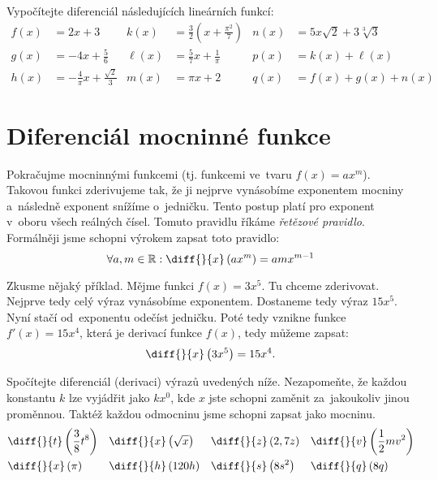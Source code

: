 \begin{exercise}
    Vypočítejte diferenciál následujících lineárních funkcí:
    \begin{align*}
        f(x) &= 2x + 3
        & k(x) &= \frac{3}{2} \left( x + \frac{\pi^2}{7} \right) 
        & n(x) &= 5x \sqrt{2} + 3 \sqrt[3]{3} \\
        g(x) &= -4x + \frac{5}{6}
        & \ell(x) &= \frac{5}{7}x + \frac{1}{\pi}
        & p(x) &= k(x) + \ell(x) \\
        h(x) &= -\frac{4}{\pi}x + \frac{\sqrt{2}}{3}
        & m(x) &= \pi x + 2
        & q(x) &= f(x) + g(x) + n(x)
    \end{align*}
\end{exercise}

\section{Diferenciál mocninné funkce}

Pokračujme mocninnými funkcemi (tj. funkcemi ve~tvaru $f(x) = ax^m$). Takovou funkci
zderivujeme tak, že ji nejprve vynásobíme exponentem mocniny a~následně exponent
snížíme o~jedničku. Tento postup platí pro exponent v~oboru všech reálných čísel.
Tomuto pravidlu říkáme \emph{řetězové pravidlo}. Formálněji jsme schopni výrokem
zapsat toto pravidlo:
\begin{equation*}
    \forall a, m \in \mathbb{R} :
    \diff{}{x} \left(ax^m\right) = amx^{m - 1}
\end{equation*}

Zkusme nějaký příklad. Mějme funkci $f(x) = 3x^5$. Tu chceme zderivovat. Nejprve tedy
celý výraz vynásobíme exponentem. Dostaneme tedy výraz $15x^5$. Nyní stačí
od~exponentu odečíst jedničku. Poté tedy vznikne funkce $f'(x) = 15x^4$, která je
derivací funkce $f(x)$, tedy můžeme zapsat:
\begin{equation*}
    \diff{}{x} \left( 3x^5 \right) = 15x^4.
\end{equation*}

\begin{exercise}
    Spočítejte diferenciál (derivaci) výrazů uvedených níže. Nezapomeňte, že každou
    konstantu $k$ lze vyjádřit jako $kx^0$, kde $x$ jste schopni zaměnit
    za~jakoukoliv jinou proměnnou. Taktéž každou odmocninu jsme schopni zapsat jako
    mocninu.
    \begin{align*}
        &\diff{}{t} \left( \frac38 t^8 \right) &
        &\diff{}{x} \left( \sqrt{x} \right) &
        &\diff{}{z} \left( 2,7z \right) &
        &\diff{}{v} \left( \frac12 mv^2 \right) \\
        &\diff{}{x} \left( \pi \right) &
        &\diff{}{h} \left( 120h \right) &
        &\diff{}{s} \left( 8s^2 \right) &
        &\diff{}{q} \left( 8q \right)
    \end{align*}
\end{exercise}

